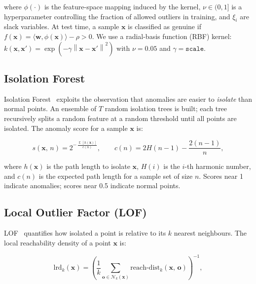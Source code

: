 \documentclass[12pt, a4paper]{article}
\DeclareMathOperator{\E}{\mathbb{E}}
\newcommand{\norm}[1]{\left\lVert#1\right\rVert}
\begin{document}
\noindent where $\phi(\cdot)$ is the feature-space mapping induced by the
kernel, $\nu \in (0,1]$ is a hyperparameter controlling the fraction of
allowed outliers in training, and $\xi_i$ are slack variables.
At test time, a sample $\mathbf{x}$ is classified as genuine if
$f(\mathbf{x}) = \langle \mathbf{w}, \phi(\mathbf{x})\rangle - \rho > 0$.
We use a radial-basis function (RBF) kernel:
$k(\mathbf{x}, \mathbf{x}') = \exp(-\gamma \norm{\mathbf{x} - \mathbf{x}'}^2)$
with $\nu = 0.05$ and $\gamma = \texttt{scale}$.

\subsection{Isolation Forest}

Isolation Forest~\cite{liu2008} exploits the observation that anomalies
are easier to \textit{isolate} than normal points. An ensemble of $T$
random isolation trees is built; each tree recursively splits a random
feature at a random threshold until all points are isolated.
The anomaly score for a sample $\mathbf{x}$ is:

\begin{mathbox}
\begin{equation}
  s(\mathbf{x},\, n)
  = 2^{-\, \frac{\E[h(\mathbf{x})]}{c(n)}},
  \qquad
  c(n) = 2 H(n-1) - \frac{2(n-1)}{n},
  \label{eq:iforest}
\end{equation}
\end{mathbox}

\noindent where $h(\mathbf{x})$ is the path length to isolate $\mathbf{x}$,
$H(i)$ is the $i$-th harmonic number, and $c(n)$ is the expected path
length for a sample set of size $n$. Scores near 1 indicate anomalies;
scores near 0.5 indicate normal points.

\subsection{Local Outlier Factor (LOF)}

LOF~\cite{breunig2000} quantifies how isolated a point is relative to
its $k$ nearest neighbours. The local reachability density of a point
$\mathbf{x}$ is:

\begin{mathbox}
\begin{equation}
  \text{lrd}_k(\mathbf{x})
  = \left(
      \frac{1}{k}
      \sum_{\mathbf{o} \in \mathcal{N}_k(\mathbf{x})}
      \text{reach-dist}_k(\mathbf{x},\, \mathbf{o})
    \right)^{-1},
  \label{eq:lrd}
\end{equation}
\end{mathbox}
\end{document}
